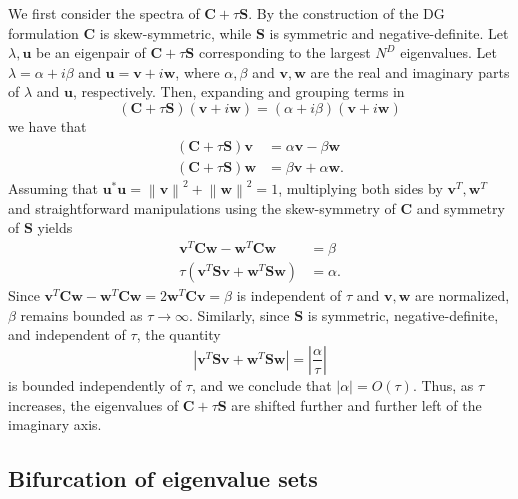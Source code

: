 \documentclass[10pt]{article}
\newcommand{\nor}[1]{\left\| #1 \right\|}
\newcommand{\LRp}[1]{\left( #1 \right)}
\newcommand{\LRb}[1]{\left| #1 \right|}
\begin{document}
We first consider the spectra of $\bm{C} + \tau\bm{S}$.  By the construction of the DG formulation $\bm{C}$ is skew-symmetric, while $\bm{S}$ is symmetric and negative-definite.  Let $\lambda, \bm{u}$ be an eigenpair of $\bm{C} + \tau{\bm{S}}$ corresponding to the largest $N^D$ eigenvalues. Let $\lambda = \alpha + i\beta$ and $\bm{u} = \bm{v} + i\bm{w}$, where $\alpha,\beta$ and $\bm{v},\bm{w}$ are the real and imaginary parts of $\lambda$ and $\bm{u}$, respectively.  Then, expanding and grouping terms in
\[
(\bm{C}+\tau\bm{S})(\bm{v} + i\bm{w}) = (\alpha + i\beta) (\bm{v} + i\bm{w})
\]
we have that
\begin{align*}
(\bm{C}+\tau\bm{S})\bm{v} &= \alpha\bm{v}-\beta\bm{w}\\
(\bm{C}+\tau\bm{S})\bm{w} &= \beta\bm{v}+\alpha\bm{w}.
\end{align*}
Assuming that $\bm{u}^*\bm{u} = \nor{\bm{v}}^2 + \nor{\bm{w}}^2 = 1$, multiplying both sides by $\bm{v}^T,\bm{w}^T$ and straightforward manipulations %
using the skew-symmetry of $\bm{C}$ and symmetry of $\bm{S}$ yields
\begin{align*}
\bm{v}^T\bm{C}\bm{w} - \bm{w}^T\bm{C}\bm{w} &= \beta\\
\tau\LRp{\bm{v}^T\bm{S}\bm{v} + \bm{w}^T\bm{S}\bm{w}} &= \alpha.
\end{align*}
Since $\bm{v}^T\bm{C}\bm{w} - \bm{w}^T\bm{C}\bm{w}= 2\bm{w}^T\bm{C}\bm{v} = \beta$ is independent of $\tau$ and $\bm{v},\bm{w}$ are normalized, $\beta$ remains bounded as $\tau\rightarrow \infty$.  Similarly, since $\bm{S}$ is symmetric, negative-definite, and independent of $\tau$, the quantity
\[
\LRb{\bm{v}^T\bm{S}\bm{v} + \bm{w}^T\bm{S}\bm{w}} = \LRb{\frac{\alpha}{\tau}}
\]
is bounded independently of $\tau$, and we conclude that $\LRb{\alpha} = O(\tau)$.  Thus, as $\tau$ increases, the eigenvalues of $\bm{C} + \tau\bm{S}$ are shifted further and further left of the imaginary axis.  

\subsection{Bifurcation of eigenvalue sets}
\end{document}
